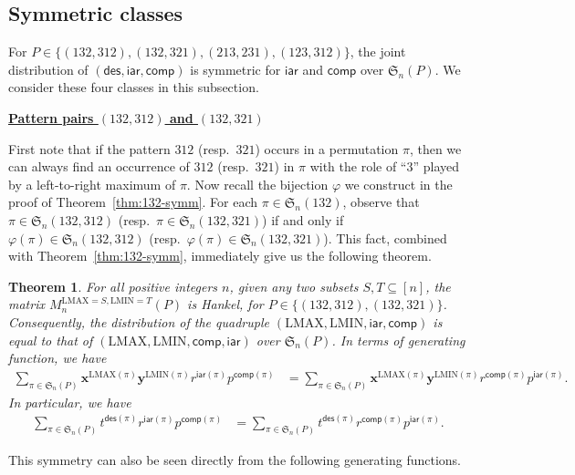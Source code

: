 \documentclass[12pt]{amsart}
\numberwithin{equation}{section}
\theoremstyle{plain}
\newtheorem{theorem}{Theorem}[section]
\theoremstyle{definition}
\def\des{\mathsf{des}}
\def\S{\mathfrak{S}}
\def\iar{\mathsf{iar}}
\def\comp{\mathsf{comp}}
\def\LMAX{\mathrm{LMAX}}
\def\LMIN{\mathrm{LMIN}}
\begin{document}
\subsection{Symmetric classes} 

For $P\in\{(132,312),(132,321), (213,231), (123,312)\}$, the joint distribution of $(\des,\iar,\comp)$ is symmetric for $\iar$ and $\comp$ over $\S_n(P)$. We consider these four classes in this subsection. 

\medskip
\noindent \underline{\bf Pattern pairs $(132,312)$ and $(132,321)$}
\medskip

First note that if the pattern $312$ (resp.~$321$) occurs in a permutation $\pi$, then we can always find an occurrence of $312$ (resp.~$321$) in $\pi$ with the role of ``$3$'' played by a left-to-right maximum of $\pi$. Now recall the bijection $\varphi$ we construct in the proof of Theorem~\ref{thm:132-symm}. For each $\pi\in\S_n(132)$, observe that $\pi\in\S_n(132,312)$ (resp.~$\pi\in\S_n(132,321)$) if and only if $\varphi(\pi)\in\S_n(132,312)$ (resp.~$\varphi(\pi)\in\S_n(132,321)$). This fact, combined with Theorem~\ref{thm:132-symm}, immediately give us the following theorem.

\begin{theorem}\label{thm:132-312 and 132-321 symm}
For all positive integers $n$, given any two subsets $S,T\subseteq [n]$, the matrix $M_n^{\LMAX=S,\LMIN=T}(P)$ is Hankel, for $P\in\{(132,312), (132,321)\}$. Consequently, the distribution of the quadruple $(\LMAX, \LMIN, \iar, \comp)$ is equal to that of $(\LMAX, \LMIN, \comp, \iar)$ over $\S_n(P)$. In terms of generating function, we have
\begin{align*} 
\sum_{\pi\in\S_n(P)}\mathbf{x}^{\LMAX(\pi)}\mathbf{y}^{\LMIN(\pi)}r^{\iar(\pi)}p^{\comp(\pi)} &= \sum_{\pi\in\S_n(P)}\mathbf{x}^{\LMAX(\pi)}\mathbf{y}^{\LMIN(\pi)}r^{\comp(\pi)}p^{\iar(\pi)}.
\end{align*}
In particular, we have
\begin{align*} 
\sum_{\pi\in\S_n(P)}t^{\des(\pi)}r^{\iar(\pi)}p^{\comp(\pi)} &= \sum_{\pi\in\S_n(P)}t^{\des(\pi)}r^{\comp(\pi)}p^{\iar(\pi)}.
\end{align*}
\end{theorem}
This symmetry can also be seen directly from the following generating functions.
\end{document}

